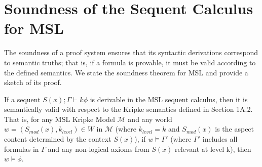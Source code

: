 \documentclass[
    12pt,              %
    a4paper,           %
    headings=normal,   %
    twoside=true,      %
    BCOR=8mm,          %
]{scrbook}
\newcommand{\Smodx}{S_{mod}(x)}
\newcommand{\turnstilek}[1][]{\vdash^{#1}}
\begin{document}
\section*{Soundness of the Sequent Calculus for MSL}

The soundness of a proof system ensures that its syntactic derivations correspond to semantic truths; that is, if a formula is provable, it must be valid according to the defined semantics. We state the soundness theorem for MSL and provide a sketch of its proof.

\begin{mytheorem}
If a sequent \(S(x); \Gamma \turnstilek{k} \phi\) is derivable in the MSL sequent calculus, then it is semantically valid with respect to the Kripke semantics defined in Section 1A.2. That is, for any MSL Kripke Model \(\mathcal{M}\) and any world \(w = (\Smodx, k_{level}) \in W\) in \(\mathcal{M}\) (where \(k_{level} = k\) and \(\Smodx\) is the aspect content determined by the context \(S(x)\)), if \(w \vDash \Gamma'\) (where \(\Gamma'\) includes all formulas in \(\Gamma\) and any non-logical axioms from \(S(x)\) relevant at level k), then \(w \vDash \phi\).
\end{mytheorem}
\end{document}
